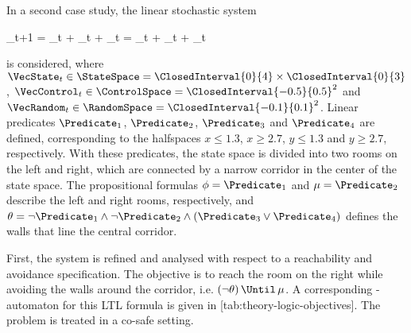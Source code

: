 In a second case study, the linear stochastic system

\startformula
    \VecX_{t+1} =  \VecState_{t} +  \VecControl_{t} + \VecRandom_{t} = \VecState_{t} + \VecControl_{t} + \VecRandom_{t}
\stopformula

is considered, where $\VecState_{t} \in \StateSpace = \ClosedInterval{0}{4} \times \ClosedInterval{0}{3}$, $\VecControl_{t} \in \ControlSpace = \ClosedInterval{-0.5}{0.5}^2$ and $\VecRandom_{t} \in \RandomSpace = \ClosedInterval{-0.1}{0.1}^2$.
Linear predicates $\Predicate_1$, $\Predicate_2$, $\Predicate_3$ and $\Predicate_4$ are defined, corresponding to the halfspaces $x \le 1.3$, $x \ge 2.7$, $y \le 1.3$ and $y \ge 2.7$, respectively.
With these predicates, the state space is divided into two rooms on the left and right, which are connected by a narrow corridor in the center of the state space.
The propositional formulas $\phi = \Predicate_1$ and $\mu = \Predicate_2$ describe the left and right rooms, respectively, and $\theta = \neg \Predicate_1 \wedge \neg \Predicate_2 \wedge (\Predicate_3 \vee \Predicate_4)$ defines the walls that line the central corridor.

\startsubsection[title={Reachability Analysis},reference=sec:cases-corridor-reachability]


    First, the system is refined and analysed with respect to a reachability and avoidance specification.
    The objective is to reach the room on the right while avoiding the walls around the corridor, i.e.  $( \neg \theta ) \,\Until\, \mu$.
    A corresponding \omega-automaton for this LTL formula is given in [tab:theory-logic-objectives].
    The problem is treated in a co-safe setting.

